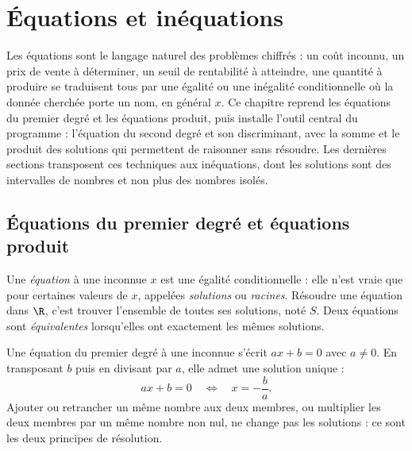 \chapter{Équations et inéquations}

\begin{quelqueslignes}
Les équations sont le langage naturel des problèmes chiffrés : un coût inconnu, un prix de vente à déterminer, un seuil de rentabilité à atteindre, une quantité à produire se traduisent tous par une égalité ou une inégalité conditionnelle où la donnée cherchée porte un nom, en général $x$. Ce chapitre reprend les équations du premier degré et les équations produit, puis installe l'outil central du programme : l'équation du second degré et son discriminant, avec la somme et le produit des solutions qui permettent de raisonner sans résoudre. Les dernières sections transposent ces techniques aux inéquations, dont les solutions sont des intervalles de nombres et non plus des nombres isolés.
\end{quelqueslignes}

\section{Équations du premier degré et équations produit}

\begin{definition}
Une \emph{équation} à une inconnue $x$ est une égalité conditionnelle : elle n'est vraie que pour certaines valeurs de $x$, appelées \emph{solutions} ou \emph{racines}. Résoudre une équation dans $\R$, c'est trouver l'ensemble de toutes ses solutions, noté $S$. Deux équations sont \emph{équivalentes} lorsqu'elles ont exactement les mêmes solutions.
\end{definition}

\begin{propriete}
Une équation du premier degré à une inconnue s'écrit $ax + b = 0$ avec $a \neq 0$. En transposant $b$ puis en divisant par $a$, elle admet une solution unique :
\[
ax + b = 0 \quad\Longleftrightarrow\quad x = -\frac{b}{a}.
\]
Ajouter ou retrancher un même nombre aux deux membres, ou multiplier les deux membres par un même nombre non nul, ne change pas les solutions : ce sont les deux principes de résolution.
\end{propriete}

